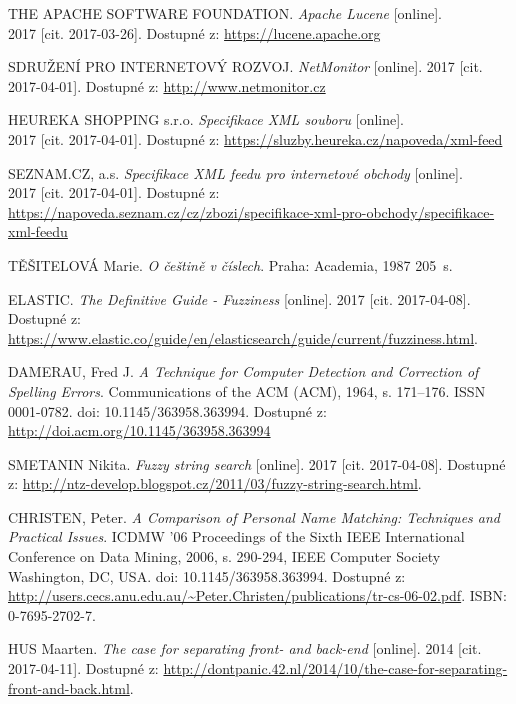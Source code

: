 \documentclass[FM,DP]{tulthesis}
\begin{document}
\begin{thebibliography}{Mm99}
 THE APACHE SOFTWARE FOUNDATION. \emph{Apache Lucene} [online].\\
2017 [cit. 2017-03-26]. Dostupné z: \url{https://lucene.apache.org}

 SDRUŽENÍ PRO INTERNETOVÝ ROZVOJ. \emph{NetMonitor} [online].
2017 [cit. 2017-04-01]. Dostupné z: \url{http://www.netmonitor.cz}

 HEUREKA SHOPPING s.r.o. \emph{Specifikace XML souboru} [online].\\
2017 [cit. 2017-04-01]. Dostupné z: \url{https://sluzby.heureka.cz/napoveda/xml-feed}

 SEZNAM.CZ, a.s. \emph{Specifikace XML feedu pro internetové obchody} [online].\\
2017 [cit. 2017-04-01]. Dostupné z:
\url{https://napoveda.seznam.cz/cz/zbozi/specifikace-xml-pro-obchody/specifikace-xml-feedu}

 TĚŠITELOVÁ Marie. \emph{O češtině v číslech}.
Praha: Academia, 1987 205~s.

 ELASTIC. \emph{The Definitive Guide - Fuzziness} [online].
2017 [cit. 2017-04-08]. Dostupné z:
\url{https://www.elastic.co/guide/en/elasticsearch/guide/current/fuzziness.html}.

 DAMERAU, Fred J. \emph{A Technique for Computer Detection and Correction of Spelling Errors}.
Communications of the ACM (ACM), 1964, s. 171–176. ISSN 0001-0782. doi: 10.1145/363958.363994.
Dostupné z: \url{http://doi.acm.org/10.1145/363958.363994}

 SMETANIN Nikita. \emph{Fuzzy string search} [online].
2017 [cit. 2017-04-08]. 
Dostupné z: \url{http://ntz-develop.blogspot.cz/2011/03/fuzzy-string-search.html}.

 CHRISTEN, Peter. \emph{A Comparison of Personal Name Matching: Techniques and Practical Issues}.
ICDMW '06 Proceedings of the Sixth IEEE International Conference on Data Mining, 2006, s. 290-294,
IEEE Computer Society Washington, DC, USA. doi: 10.1145/363958.363994. 
Dostupné z: \url{http://users.cecs.anu.edu.au/~Peter.Christen/publications/tr-cs-06-02.pdf}. 
ISBN: 0-7695-2702-7.

 HUS Maarten. \emph{The case for separating front- and back-end} [online].
2014 [cit. 2017-04-11]. 
Dostupné z: \url{http://dontpanic.42.nl/2014/10/the-case-for-separating-front-and-back.html}.


\end{thebibliography}
\end{document}
